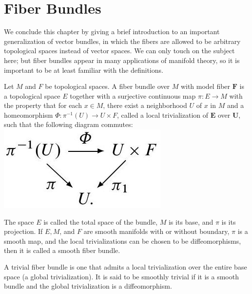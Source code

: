 \documentclass[10pt]{article}
\begin{document}
\section*{Fiber Bundles}
We conclude this chapter by giving a brief introduction to an important generalization of vector bundles, in which the fibers are allowed to be arbitrary topological spaces instead of vector spaces. We can only touch on the subject here; but fiber bundles appear in many applications of manifold theory, so it is important to be at least familiar with the definitions.

Let $M$ and $F$ be topological spaces. A fiber bundle over $M$ with model fiber $\boldsymbol{F}$ is a topological space $E$ together with a surjective continuous map $\pi: E \rightarrow M$ with the property that for each $x \in M$, there exist a neighborhood $U$ of $x$ in $M$ and a homeomorphism $\Phi: \pi^{-1}(U) \rightarrow U \times F$, called a local trivialization of $\boldsymbol{E}$ over $\boldsymbol{U}$, such that the following diagram commutes:\\
\includegraphics[max width=\textwidth, center]{2025_06_03_90f64b1a1e243cccc2e0g-286}

The space $E$ is called the total space of the bundle, $M$ is its base, and $\pi$ is its projection. If $E, M$, and $F$ are smooth manifolds with or without boundary, $\pi$ is a smooth map, and the local trivializations can be chosen to be diffeomorphisms, then it is called a smooth fiber bundle.

A trivial fiber bundle is one that admits a local trivialization over the entire base space (a global trivialization). It is said to be smoothly trivial if it is a smooth bundle and the global trivialization is a diffeomorphism.
\end{document}
